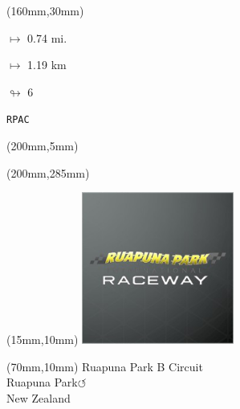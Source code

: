 \begin{textblock*}{40mm}(160mm,30mm)%
\Large
\par$\mapsto$ 0.74 mi.
\par$\mapsto$ 1.19 km
\par$\looparrowright$ 6
\par\hfill\tiny\tt RPAC\\
\end{textblock*}
\begin{textblock*}{20mm}(200mm,5mm)%
\fbox{\thepage}
\label{RPAC}
\end{textblock*}
\begin{textblock*}{20mm}(200mm,285mm)%
\fbox{\thepage}
\end{textblock*}

\null\newpage
\begin{textblock*}{50mm}(15mm,10mm)%
\includegraphics[width=50mm]{LG/RUPU.png}
\end{textblock*}
\begin{textblock*}{130mm}(70mm,10mm)%
{\fontsize{20}{20}\selectfont Ruapuna Park B Circuit\\}
{\fontsize{16}{16}\selectfont Ruapuna Park\hfill \huge$\circlearrowleft$\\}
{\fontsize{12}{12}\selectfont New Zealand\\}
\end{textblock*}
